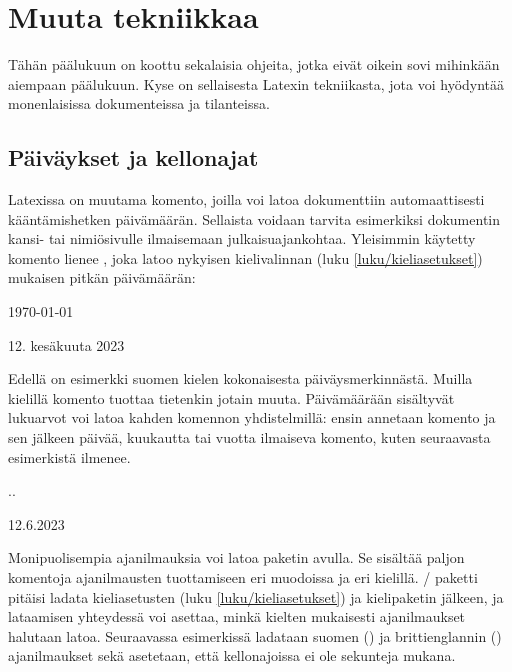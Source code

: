 
\chapter{Muuta tekniikkaa}

Tähän päälukuun on koottu sekalaisia ohjeita, jotka eivät oikein sovi
mihinkään aiempaan päälukuun. Kyse on sellaisesta Latexin tekniikasta,
jota voi hyödyntää monenlaisissa dokumenteissa ja tilanteissa.

\section{Päiväykset ja kellonajat}

Latexissa on muutama komento, joilla voi latoa dokumenttiin
automaattisesti kääntämishetken päivämäärän. Sellaista voidaan tarvita
esimerkiksi dokumentin kansi- tai nimiösivulle ilmaisemaan
julkaisuajankohtaa. Yleisimmin käytetty komento lienee ,
joka latoo nykyisen kielivalinnan (luku \ref{luku/kieliasetukset})
mukaisen pitkän päivämäärän:

\begin{koodilohkosis}
\today
\end{koodilohkosis}

\begin{tulossis}
  12. kesäkuuta 2023
\end{tulossis}

\noindent
Edellä on esimerkki suomen kielen kokonaisesta päiväysmerkinnästä.
Muilla kielillä komento tuottaa tietenkin jotain muuta. Päivämäärään
sisältyvät lukuarvot voi latoa kahden komennon yhdistelmillä: ensin
annetaan komento  ja sen jälkeen päivää, kuukautta tai
vuotta ilmaiseva komento, kuten seuraavasta esimerkistä ilmenee.

\begin{koodilohkosis}
\the\day.\the\month.\the\year
\end{koodilohkosis}

\begin{tulossis}
  12.6.2023
\end{tulossis}

\noindent
Monipuolisempia ajanilmauksia voi latoa paketin 
avulla. Se sisältää paljon komentoja ajanilmausten tuottamiseen eri
muodoissa ja eri kielillä. \-/ paketti pitäisi ladata
kieliasetusten (luku \ref{luku/kieliasetukset}) ja kielipaketin jälkeen,
ja lataamisen yhteydessä voi asettaa, minkä kielten mukaisesti
ajanilmaukset halutaan latoa. Seuraavassa esimerkissä ladataan suomen
() ja brittienglannin () ajanilmaukset sekä
asetetaan, että kellonajoissa ei ole sekunteja mukana.

